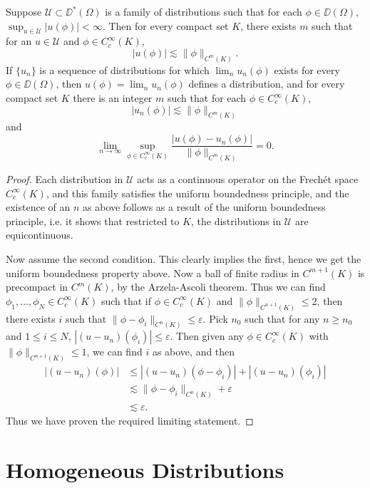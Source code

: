 \begin{theorem}
    Suppose $\mathcal{U} \subset \DD^*(\Omega)$ is a family of distributions such that for each $\phi \in \DD(\Omega)$, $\sup_{u \in \mathcal{U}} |u(\phi)| < \infty$. Then for every compact set $K$, there exists $m$ such that for an $u \in \mathcal{U}$ and $\phi \in C_c^\infty(K)$,
    \[ |u(\phi)| \lesssim \| \phi \|_{C^m(K)}. \]
    If $\{ u_n \}$ is a sequence of distributions for which $\lim_n u_n(\phi)$ exists for every $\phi \in \DD(\Omega)$, then $u(\phi) = \lim_n u_n(\phi)$ defines a distribution, and for every compact set $K$ there is an integer $m$ such that for each $\phi \in C_c^\infty(K)$,
    \[ |u_n(\phi)| \lesssim \| \phi \|_{C^m(K)} \]
    and
    \[ \lim_{n \to \infty} \sup_{\phi \in C_c^\infty(K)} \frac{|u(\phi) - u_n(\phi)|}{\| \phi \|_{C^m(K)}} = 0. \]
\end{theorem}
\begin{proof}
    Each distribution in $\mathcal{U}$ acts as a continuous operator on the Frech\'{e}t space $C_c^\infty(K)$, and this family satisfies the uniform boundedness principle, and the existence of an $n$ as above follows as a result of the uniform boundedness principle, i.e. it shows that restricted to $K$, the distributions in $\mathcal{U}$ are equicontinuous.

    Now assume the second condition. This clearly implies the first, hence we get the uniform boundedness property above. Now a ball of finite radius in $C^{m+1}(K)$ is precompact in $C^m(K)$, by the Arzela-Ascoli theorem. Thus we can find $\phi_1,\dots,\phi_N \in C_c^\infty(K)$ such that if $\phi \in C_c^\infty(K)$ and $\| \phi \|_{C^{n+1}(K)} \leq 2$, then there exists $i$ such that $\| \phi - \phi_i \|_{C^n(K)} \leq \varepsilon$. Pick $n_0$ such that for any $n \geq n_0$ and $1 \leq i \leq N$, $|(u - u_n)(\phi_i)| \leq \varepsilon$. Then given any $\phi \in C_c^\infty(K)$ with $\| \phi \|_{C^{n+1}(K)} \leq 1$, we can find $i$ as above, and then
    \begin{align*}
        |(u - u_n)(\phi)| &\leq |(u - u_n)(\phi - \phi_i)| + |(u - u_n)(\phi_i)|\\
        &\lesssim \| \phi - \phi_i \|_{C^n(K)} + \varepsilon\\
        &\lesssim \varepsilon.
    \end{align*}
    Thus we have proven the required limiting statement.
\end{proof}

\section{Homogeneous Distributions}

